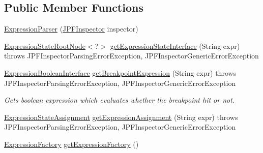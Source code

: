 \subsection*{Public Member Functions}
\begin{DoxyCompactItemize}
\item 
\hyperlink{classgov_1_1nasa_1_1jpf_1_1inspector_1_1server_1_1expression_1_1_expression_parser_a4a385cf5c1d3cbb780cd50b943aa89cd}{Expression\+Parser} (\hyperlink{classgov_1_1nasa_1_1jpf_1_1inspector_1_1server_1_1jpf_1_1_j_p_f_inspector}{J\+P\+F\+Inspector} inspector)
\begin{DoxyCompactList}\small\item\em 
\begin{DoxyItemize}
\item 
\end{DoxyItemize}\end{DoxyCompactList}\item 
\hyperlink{interfacegov_1_1nasa_1_1jpf_1_1inspector_1_1server_1_1expression_1_1_expression_state_root_node}{Expression\+State\+Root\+Node}$<$?$>$ \hyperlink{classgov_1_1nasa_1_1jpf_1_1inspector_1_1server_1_1expression_1_1_expression_parser_a0b6378f9bb019b8ba7a226af19a6f6e8}{get\+Expression\+State\+Interface} (String expr)  throws J\+P\+F\+Inspector\+Parsing\+Error\+Exception, J\+P\+F\+Inspector\+Generic\+Error\+Exception 
\item 
\hyperlink{interfacegov_1_1nasa_1_1jpf_1_1inspector_1_1server_1_1expression_1_1_expression_boolean_interface}{Expression\+Boolean\+Interface} \hyperlink{classgov_1_1nasa_1_1jpf_1_1inspector_1_1server_1_1expression_1_1_expression_parser_a6d1f78dfb6f1ea7cf350cb3926c5277f}{get\+Breakpoint\+Expression} (String expr)  throws J\+P\+F\+Inspector\+Parsing\+Error\+Exception, J\+P\+F\+Inspector\+Generic\+Error\+Exception 
\begin{DoxyCompactList}\small\item\em Gets boolean expression which evaluates whether the breakpoint hit or not. \end{DoxyCompactList}\item 
\hyperlink{classgov_1_1nasa_1_1jpf_1_1inspector_1_1server_1_1expression_1_1expressions_1_1_expression_state_assignment}{Expression\+State\+Assignment} \hyperlink{classgov_1_1nasa_1_1jpf_1_1inspector_1_1server_1_1expression_1_1_expression_parser_add6550e342375554df83bfbe4abaecbf}{get\+Expression\+Assignment} (String expr)  throws J\+P\+F\+Inspector\+Parsing\+Error\+Exception, J\+P\+F\+Inspector\+Generic\+Error\+Exception 
\item 
\hyperlink{classgov_1_1nasa_1_1jpf_1_1inspector_1_1server_1_1expression_1_1_expression_factory}{Expression\+Factory} \hyperlink{classgov_1_1nasa_1_1jpf_1_1inspector_1_1server_1_1expression_1_1_expression_parser_a17c41c98e8b23eb8fad627c36045b43e}{get\+Expression\+Factory} ()
\end{DoxyCompactItemize}
